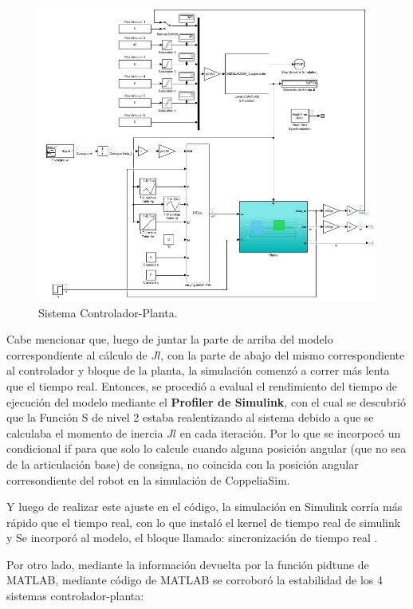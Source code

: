 \documentclass{article}
\begin{document}
\begin{sloppypar}
\begin{figure}[H]
    \centering
    \includegraphics[width=1\textwidth]{Sistema Controlador-Planta}
    \caption{Sistema Controlador-Planta.}
    \label{fig:Sistema Controlador-Planta}
\end{figure}

Cabe mencionar que, luego de juntar la parte de arriba del modelo correspondiente al cálculo de $Jl$, con la parte de abajo del mismo correspondiente al controlador y bloque de la planta, la simulación comenzó a correr más lenta que el tiempo real. Entonces, se procedió a evalual el rendimiento del tiempo de ejecución del modelo mediante el \textbf{Profiler de Simulink}, con el cual se descubrió que la Función S de nivel 2 estaba realentizando al sistema debido a que se calculaba el momento de inercia $Jl$ en cada iteración. Por lo que se incorpocó un condicional if para que solo lo calcule cuando alguna posición angular (que no sea de la articulación base) de consigna, no coincida con la posición angular corresondiente del robot en la simulación de CoppeliaSim.

Y luego de realizar este ajuste en el código, la simulación en Simulink corría más rápido que el tiempo real, con lo que instaló el kernel de tiempo real de simulink y Se incorporó al modelo, el bloque llamado: sincronización de tiempo real .

Por otro lado, mediante la información devuelta por la función pidtune de MATLAB, mediante código de MATLAB se corroboró la estabilidad de los 4 sistemas controlador-planta:


\end{sloppypar}
\end{document}
